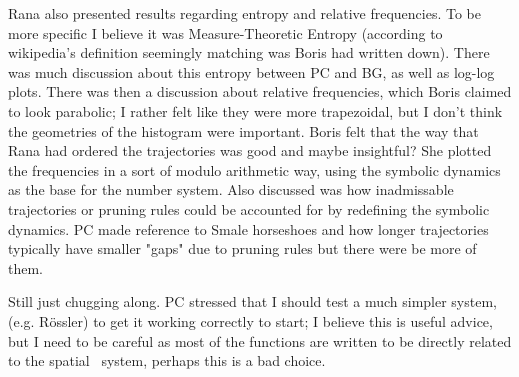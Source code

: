 \begin{description}
{\begin{description}
Rana also presented results regarding entropy and relative frequencies. To be
more specific I believe it was Measure-Theoretic Entropy (according to
wikipedia's definition seemingly matching was Boris had written down). There
was much discussion about this entropy between PC and BG, as well as log-log
plots. There was then a discussion about relative frequencies, which Boris
claimed to look parabolic; I rather felt like they were more trapezoidal, but
I don't think the geometries of the histogram were important. Boris felt that
the way that Rana had ordered the trajectories was good and maybe insightful?
She plotted the frequencies in a sort of modulo arithmetic way, using the
symbolic dynamics as the base for the number system. Also discussed was how
inadmissable trajectories or pruning rules could be accounted for by
redefining the symbolic dynamics. PC made reference to Smale horseshoes and
how longer trajectories typically have smaller "gaps" due to pruning rules
but there were be more of them.

\item[Python]
Still just chugging along. PC stressed that I should test a much simpler
system, (e.g. R\"ossler) to get it working correctly to start; I believe this
is useful advice, but I need to be careful as most of the functions are
written to be directly related to the spatial \KS\ system, perhaps this is a
bad choice.
\end{description}
}



\end{description}
